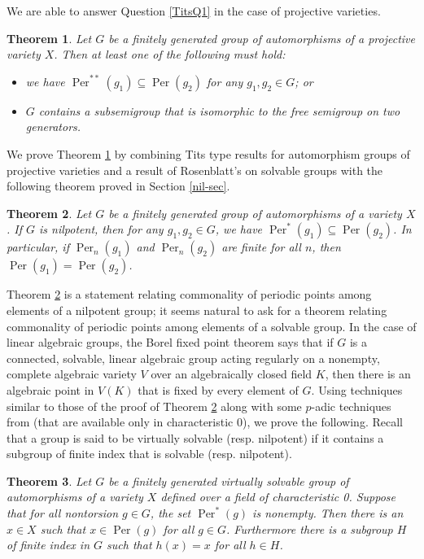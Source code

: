 \documentclass{amsart}
\DeclareMathOperator{\Per}{Per}
\newtheorem{thm}{Theorem}[section]
\theoremstyle{definition}
\begin{document}
We are able to answer Question \ref{TitsQ1} in the case of projective
varieties.

\begin{thm}\label{auto-proj}
  Let $G$ be a finitely generated group of automorphisms of a
  projective variety $X$.  Then at least one of the following must hold:
\begin{itemize}
\item[(i)] we have $\Per^{**}(g_1) \subseteq \Per(g_2)$ for any $g_1,
  g_2 \in G$; or
\item[(ii)] $G$ contains a subsemigroup that is isomorphic to the free
  semigroup on two generators.
\end{itemize}
\end{thm}

We prove Theorem \ref{auto-proj} by combining Tits type results for
automorphism groups of projective varieties \cite{Tits-Var,
    Tits-Var-Z, Hu} and a result of Rosenblatt's on solvable groups
  \cite{Rosenblatt} with the following theorem proved in Section \ref{nil-sec}.


  \begin{thm}\label{nil-same}
  Let $G$ be a finitely generated group of automorphisms of a variety
  $X$.  If $G$ is nilpotent, then for any
  $g_1, g_2 \in G$, we have $\Per^{*}(g_1) \subseteq \Per(g_2)$.  In
  particular, if $\Per_n(g_1)$  and $\Per_n(g_2)$ are finite for all
  $n$, then $\Per(g_1) = \Per(g_2)$.  
 \end{thm}

 Theorem \ref{nil-same} is a statement relating commonality of
 periodic points among elements of a nilpotent group; it seems natural
 to ask for a theorem relating commonality of periodic points among
 elements of a solvable group.  In the case of linear algebraic
 groups, the Borel fixed point theorem \cite{Borel1, Borel2} says that
 if $G$ is a connected, solvable, linear algebraic group acting
 regularly on a nonempty, complete algebraic variety $V$ over an
 algebraically closed field $K$, then there is an algebraic point in
 $V(K)$ that is fixed by every element of $G$.  Using techniques
 similar to those of the proof of Theorem \ref{nil-same} along with
 some $p$-adic techniques from \cite{BGT1, BGT2} (that are available
 only in characteristic 0), we prove the following.  Recall that a
 group is said to be virtually solvable (resp. nilpotent) if it
 contains a subgroup of finite index that is solvable
 (resp. nilpotent).  
 
 \begin{thm}\label{solvable}
  Let $G$ be a finitely generated virtually solvable group of automorphisms of a
  variety $X$ defined over a field of characteristic 0.  Suppose that
  for all nontorsion $g \in G$, the set $\Per^{*}(g)$ is nonempty.
  Then there is an $x \in X$ such that $x \in \Per(g)$ for all $g \in
  G$.  Furthermore there is a subgroup $H$ of finite index in $G$ such
  that $h(x) = x$ for all $h \in H$.  
 \end{thm}
  
\end{document}
